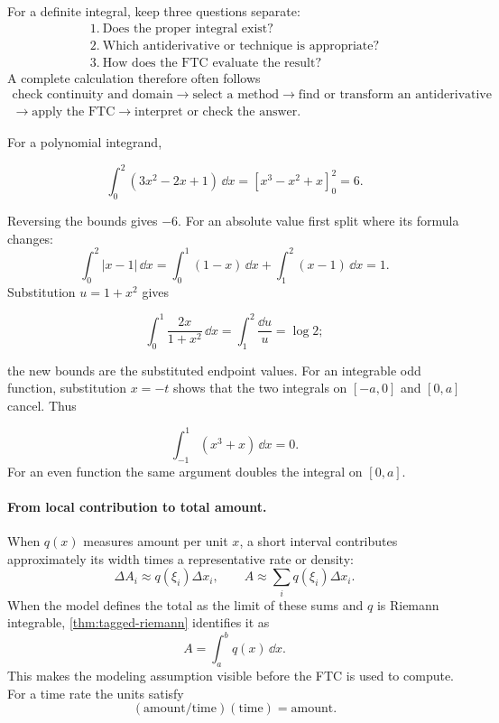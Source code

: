 For a definite integral, keep three questions separate:
\[
\boxed{
\begin{array}{l}
1.\ \text{Does the proper integral exist?}\\
2.\ \text{Which antiderivative or technique is appropriate?}\\
3.\ \text{How does the FTC evaluate the result?}
\end{array}}
\]
A complete calculation therefore often follows
\[
\begin{gathered}
\text{check continuity and domain}
\longrightarrow
\text{select a method}
\longrightarrow
\text{find or transform an antiderivative}\\
\longrightarrow
\text{apply the FTC}
\longrightarrow
\text{interpret or check the answer}.
\end{gathered}
\]

\begin{example}
For a polynomial integrand,

\[
\int_0^2(3x^2-2x+1)\,\dd x=[x^3-x^2+x]_0^2=6.
\]

Reversing the bounds gives $-6$.
For an absolute value first split where its formula changes:
\[
\int_0^2|x-1|\,\dd x
=\int_0^1(1-x)\,\dd x+\int_1^2(x-1)\,\dd x=1.
\]
Substitution $u=1+x^2$ gives

\[
\int_0^1\frac{2x}{1+x^2}\,\dd x=\int_1^2\frac{\dd u}{u}=\log2;
\]

the new bounds are the substituted endpoint values.
For an integrable odd function, substitution $x=-t$ shows that the
two integrals on $[-a,0]$ and $[0,a]$ cancel. Thus

\[
\int_{-1}^1(x^3+x)\,\dd x=0.
\]
 For an even function the same
argument doubles the integral on $[0,a]$.
\end{example}

\paragraph{From local contribution to total amount.}
When $q(x)$ measures amount per unit $x$, a short interval contributes
approximately its width times a representative rate or density:
\[
\Delta A_i\approx q(\xi_i)\Delta x_i,
\qquad A\approx\sum_i q(\xi_i)\Delta x_i.
\]
When the model defines the total as the limit of these sums and $q$ is
Riemann integrable, \cref{thm:tagged-riemann} identifies it as
\[
A=\int_a^bq(x)\,\dd x.
\]
This makes the modeling assumption visible before the FTC is used to
compute. For a time rate the units satisfy
\[
(\text{amount/time})(\text{time})=\text{amount}.
\]

